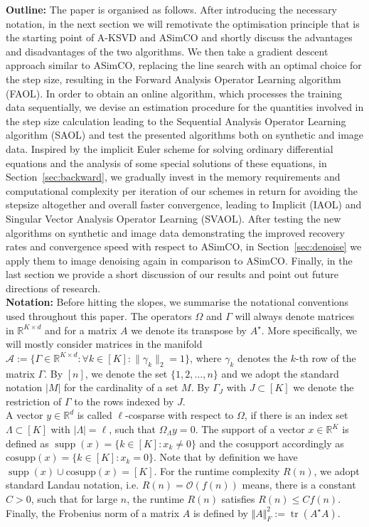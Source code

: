 \documentclass[11pt, onecolumn, journal,compsoc]{IEEEtran}
\newcommand{\cosupp}{\mathrm{cosupp}}
\newcommand\tr{\operatorname{tr}}
\newcommand{\R}{{\mathbb{R}}}
\newcommand{\supp}{\operatorname{supp}}
\newcommand{\Ocal}{\mathcal{O}}
\newcommand{\Acal}{\mathcal{A}}
\theoremstyle{plain}
\theoremstyle{remark}
\begin{document}
{\bf Outline:} The paper is organised as follows. After introducing the necessary notation, in the next section we will remotivate the optimisation principle that is the starting point of A-KSVD and ASimCO and shortly discuss the advantages and disadvantages of the two algorithms. We then take a gradient descent approach similar to ASimCO, replacing the line search with an optimal choice for the step size, resulting in the Forward Analysis Operator Learning algorithm (FAOL). In order to obtain an online algorithm, which processes the training data sequentially, we devise an estimation procedure for the quantities involved in the step size calculation leading to the Sequential Analysis Operator Learning algorithm (SAOL) and test the presented algorithms both on synthetic and image data. Inspired by the implicit Euler scheme for solving ordinary differential equations and the analysis of some special solutions of these equations, in Section~\ref{sec:backward}, we gradually invest in the memory requirements and computational complexity per iteration of our schemes in return for avoiding the stepsize altogether and overall faster convergence, leading to Implicit (IAOL) and Singular Vector Analysis Operator Learning (SVAOL). After testing the new algorithms on synthetic and image data demonstrating the improved recovery rates and convergence speed with respect to ASimCO, in Section~\ref{sec:denoise} we apply them to image denoising again in comparison to ASimCO. Finally, in the last section we provide a short discussion of our results and point out future directions of research.\\
{\bf Notation:} Before hitting the slopes, we summarise the notational conventions used throughout this paper. The operators $\Omega$ and $\Gamma$ will always denote matrices in $\R^{K\times d}$ and for a matrix $A$ we denote its transpose by $A^\star$. More specifically, we will mostly consider matrices in the manifold $\Acal := \{\Gamma\in\R^{K\times d}\colon \forall k\in[K]\colon \|\gamma_k\|_2 = 1\}$, where $\gamma_k$ denotes the $k$-th row of the matrix $\Gamma$. By $[n]$, we denote the set $\{1,2,\ldots, n\}$ and we adopt the standard notation $|M|$ for the cardinality of a set $M$. By $\Gamma_J$ with $J\subset [K]$ we denote the restriction of $\Gamma$ to the rows indexed by $J$.\\
A vector $y\in \R^d$ is called $\ell$-cosparse with respect to $\Omega$, if there is an index set $\Lambda\subset [K]$ with $|\Lambda|=\ell$, such that $\Omega_\Lambda y = 0$. The support of a vector $x\in\R^K$ is defined as $\supp(x) = \{k\in[K]\colon x_k\neq0\}$ and the cosupport accordingly as $\cosupp(x) = \{k\in[K]\colon x_k=0\}$. Note that by definition we have $\supp(x) \cup \cosupp(x) =[K]$.
For the runtime complexity $R(n)$, we adopt standard Landau notation, i.e. $R(n)=\Ocal(f(n))$ means, there is a constant $C>0$, such that for large $n$, the runtime $R(n)$ satisfies $R(n)\leq Cf(n)$. \\
Finally, the Frobenius norm of a matrix $A$ is defined by $\Vert A\Vert_F^2:= \tr(A^\star A)$.
\end{document}
